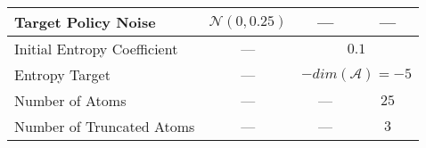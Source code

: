 \begin{table}[ht]
\begin{tabular}{l|ccc}
        Target Policy Noise         & \(\mathcal{N}(0, 0.25)\)   & ---            & ---                                        \\ \hline
        Initial Entropy Coefficient & ---                        & \multicolumn{2}{c}{\(0.1\)}                                 \\
        Entropy Target              & ---                        & \multicolumn{2}{c}{\(-dim(\mathcal{A})=-5\)}                \\ \hline
        Number of Atoms             & ---                        & ---            & \(25\)                                     \\
        Number of Truncated Atoms   & ---                        & ---            & \(3\)                                      \\
    \end{tabular}
\end{table}
\capstarttrue%
